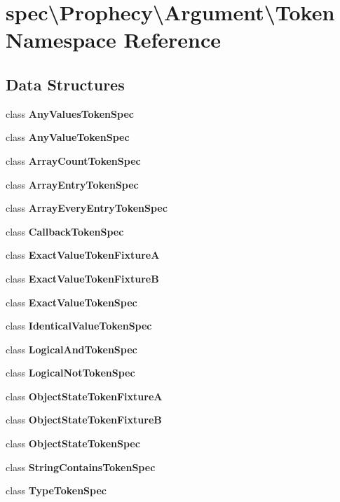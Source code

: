 \section{spec\textbackslash{}Prophecy\textbackslash{}Argument\textbackslash{}Token Namespace Reference}
\label{namespacespec_1_1_prophecy_1_1_argument_1_1_token}
\subsection*{Data Structures}
\begin{DoxyCompactItemize}
\item 
class {\bf Any\+Values\+Token\+Spec}
\item 
class {\bf Any\+Value\+Token\+Spec}
\item 
class {\bf Array\+Count\+Token\+Spec}
\item 
class {\bf Array\+Entry\+Token\+Spec}
\item 
class {\bf Array\+Every\+Entry\+Token\+Spec}
\item 
class {\bf Callback\+Token\+Spec}
\item 
class {\bf Exact\+Value\+Token\+Fixture\+A}
\item 
class {\bf Exact\+Value\+Token\+Fixture\+B}
\item 
class {\bf Exact\+Value\+Token\+Spec}
\item 
class {\bf Identical\+Value\+Token\+Spec}
\item 
class {\bf Logical\+And\+Token\+Spec}
\item 
class {\bf Logical\+Not\+Token\+Spec}
\item 
class {\bf Object\+State\+Token\+Fixture\+A}
\item 
class {\bf Object\+State\+Token\+Fixture\+B}
\item 
class {\bf Object\+State\+Token\+Spec}
\item 
class {\bf String\+Contains\+Token\+Spec}
\item 
class {\bf Type\+Token\+Spec}
\end{DoxyCompactItemize}
